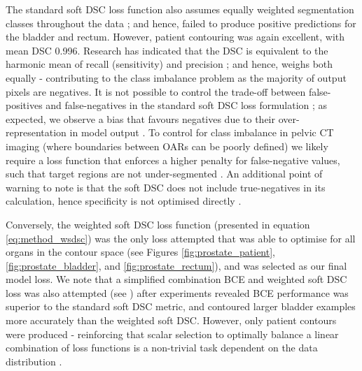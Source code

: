 The standard soft DSC loss function also assumes equally weighted segmentation classes throughout the data \cite{Sudre_2017}; and hence, failed to produce positive predictions for the bladder and rectum. However, patient contouring was again excellent,
with mean DSC 0.996. Research has indicated that the DSC is equivalent to the harmonic mean of recall (sensitivity) and precision \cite{Bebis2019}; and hence, weighs both equally \cite{Bebis2019} - contributing to the class imbalance problem as the majority of output pixels are negatives. It is not possible to control the trade-off between false-positives and false-negatives in the standard soft DSC loss formulation \cite{taghanaki2018};
as expected, we observe a bias that favours negatives due to their over-representation in model output \cite{taghanaki2018}.  To control for class imbalance in pelvic CT imaging (where boundaries between OARs can be poorly defined) we likely require a loss function that enforces a higher penalty for false-negative values, such that target regions are not under-segmented \cite{taghanaki2018}. An additional point of warning to note is that the soft DSC does not include true-negatives in its calculation, hence specificity is not optimised directly \cite{taghanaki2018}.

Conversely, the weighted soft DSC loss function (presented in equation \ref{eq:method_wsdsc}) was the only loss attempted that was able to optimise for all organs in the contour space (see Figures \ref{fig:prostate_patient}, \ref{fig:prostate_bladder}, and \ref{fig:prostate_rectum}), and was selected as our final model loss. We note that a simplified combination BCE and weighted soft DSC loss was also attempted (see \cite{taghanaki2018}) after experiments revealed BCE performance was superior to the standard soft DSC metric, and contoured larger bladder examples more accurately than the weighted soft DSC. However, only patient contours were produced - reinforcing that scalar selection to optimally balance a linear combination of loss functions is a non-trivial task dependent on the data distribution \cite{Bertels2019}. 
 

